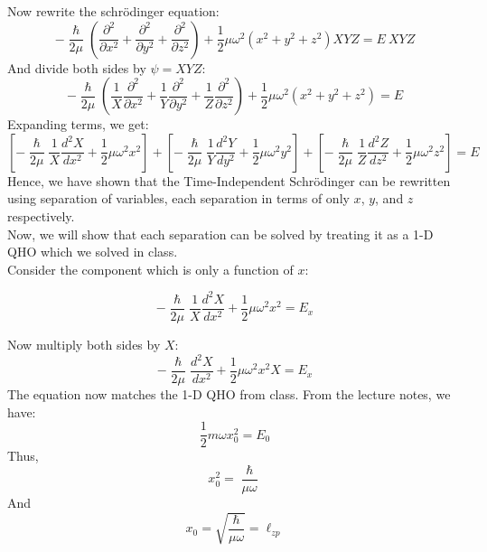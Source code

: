 \documentclass[10pt]{article}
\begin{document}
\begin{enumerate}
\begin{enumerate}
    Now rewrite the schr{\"o}dinger equation:
    \begin{equation*}
      - \frac{\hslash}{2 \mu} \left( \frac{\partial^2 }{\partial x^2}+\frac{\partial ^2}{\partial y^2} + \frac{\partial ^2}{\partial z^2} \right) + \frac{1}{2} \mu \omega ^2 \left( x^2+y^2+z^2 \right) XYZ = E~XYZ
    \end{equation*}
    And divide both sides by $ \psi = XYZ $:
    \begin{equation*}
      - \frac{\hslash}{2 \mu} \left( \frac{1}{X}\frac{\partial^2 }{\partial x^2}+\frac{1}{Y}\frac{\partial ^2}{\partial y^2} + \frac{1}{Z}\frac{\partial ^2}{\partial z^2} \right) + \frac{1}{2} \mu \omega ^2 \left( x^2+y^2+z^2 \right) = E
    \end{equation*}
    Expanding terms, we get:
    \begin{equation*}
      \left[ -\frac{\hslash}{2\mu} \frac{1}{X} \frac{d ^2 X}{d x^2} + \frac{1}{2} \mu \omega ^2 x^2 \right] + 
      \left[ -\frac{\hslash}{2\mu} \frac{1}{Y} \frac{d ^2 Y}{d y^2} + \frac{1}{2} \mu \omega ^2 y^2 \right] + 
      \left[ -\frac{\hslash}{2\mu} \frac{1}{Z} \frac{d ^2 Z}{d z^2} + \frac{1}{2} \mu \omega ^2 z^2 \right] = E
    \end{equation*}
    Hence, we have shown that the Time-Independent Schr{\"o}dinger can be rewritten using separation of variables, each separation in terms of only $ x $, $ y $, and $ z $ respectively. \\
    Now, we will show that each separation can be solved by treating it as a 1-D QHO which we solved in class. \\
    Consider the component which is only a function of $ x $:

    \begin{equation*}
      - \frac{\hslash}{2 \mu} \frac{1}{X} \frac{d ^2 X}{d x^2} + \frac{1}{2} \mu \omega ^2 x^2 = E_{x}
    \end{equation*}

    Now multiply both sides by $ X $:
    \begin{equation*}
      - \frac{\hslash}{2 \mu} \frac{d^2X}{dx^2} + \frac{1}{2} \mu \omega^2 x^2 X = E_{x}
    \end{equation*}
    The equation now matches the 1-D QHO from class.
    From the lecture notes, we have:
    \begin{equation*}
      \frac{1}{2} m \omega x_0^2 = E_0
    \end{equation*}
    Thus, 
    \begin{equation*}
      x_0^2 = \frac{\hslash}{\mu \omega}
    \end{equation*}
    And
    \begin{equation*}
      x_0 = \sqrt{\frac{\hslash}{\mu \omega}} = \ell_{zp}
    \end{equation*}


\end{enumerate}
\end{enumerate}
\end{document}
